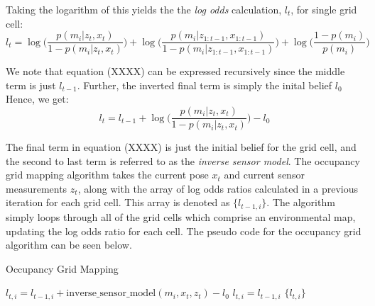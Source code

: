 \documentclass[a4paper]{article}
\begin{document}
Taking the logarithm of this yields the the \textit{log odds} calculation, $l_t$, for single grid cell:
\begin{equation}
l_t = \log \bigg( \frac{p(m_i | z_t, x_t)}{1 - p(m_i | z_t, x_t)} \bigg) + \log \bigg( \frac{p(m_i | z_{1:t-1}, x_{1:t-1})}{1 - p(m_i | z_{1:t-1}, x_{1:t-1})} \bigg) + \log \bigg( \frac{1 - p(m_i)}{p(m_i)} \bigg)
\end{equation}

We note that equation (XXXX) can be expressed recursively since the middle term is just $l_{t-1}$. Further, the inverted final term is simply the inital belief $l_0$ Hence, we get:
\begin{equation}
l_t = l_{t-1} + \log \bigg( \frac{p(m_i | z_t, x_t)}{1 - p(m_i | z_t, x_t)} \bigg) - l_0
\end{equation}

The final term in equation (XXXX) is just the initial belief for the grid cell, and the second to last term is referred to as the \textit{inverse sensor model}. The occupancy grid mapping algorithm takes the current pose $x_t$ and current sensor measurements $z_t$, along with the array of log odds ratios calculated in a previous iteration for each grid cell. This array is denoted as $\{l_{t-1,i}\}$. The algorithm simply loops through all of the grid cells which comprise an environmental map, updating the log odds ratio for each cell. The pseudo code for the occupancy grid algorithm can be seen below.

\begin{algorithm}[h]
\caption{Occupancy Grid Mapping}
\begin{algorithmic}[1]
		\State $l_{t,i} = l_{t-1,i} + \text{inverse\_sensor\_model}(m_i, x_t, z_t) - l_0$
	\Else
		\State $l_{t,i} = l_{t-1,i}$
	\EndIf
\EndFor
\Return $\{ l_{t,i} \}$
\EndProcedure
\end{algorithmic}
\end{algorithm}

\newpage
\end{document}
